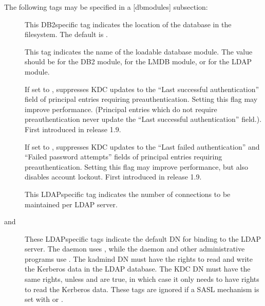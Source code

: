 \documentclass[letterpaper,10pt,english]{sphinxmanual}
\begin{document}
\sphinxAtStartPar
The following tags may be specified in a {[}dbmodules{]} subsection:
\begin{description}
\item[{}] \leavevmode
\sphinxAtStartPar
This DB2\sphinxhyphen{}specific tag indicates the location of the database in
the filesystem.  The default is {\hyperref[\detokenize{mitK5defaults:paths}]{}}.

\item[{}] \leavevmode
\sphinxAtStartPar
This tag indicates the name of the loadable database module.  The
value should be  for the DB2 module,  for the LMDB
module, or  for the LDAP module.

\item[{}] \leavevmode
\sphinxAtStartPar
If set to , suppresses KDC updates to the “Last successful
authentication” field of principal entries requiring
preauthentication.  Setting this flag may improve performance.
(Principal entries which do not require preauthentication never
update the “Last successful authentication” field.).  First
introduced in release 1.9.

\item[{}] \leavevmode
\sphinxAtStartPar
If set to , suppresses KDC updates to the “Last failed
authentication” and “Failed password attempts” fields of principal
entries requiring preauthentication.  Setting this flag may
improve performance, but also disables account lockout.  First
introduced in release 1.9.

\item[{}] \leavevmode
\sphinxAtStartPar
This LDAP\sphinxhyphen{}specific tag indicates the number of connections to be
maintained per LDAP server.

\item[{ and }] \leavevmode
\sphinxAtStartPar
These LDAP\sphinxhyphen{}specific tags indicate the default DN for binding to
the LDAP server.  The {\hyperref[\detokenize{admin/admin_commands/krb5kdc:krb5kdc-8}]{}} daemon uses
, while the {\hyperref[\detokenize{admin/admin_commands/kadmind:kadmind-8}]{}} daemon and other
administrative programs use .  The kadmind DN
must have the rights to read and write the Kerberos data in the
LDAP database.  The KDC DN must have the same rights, unless
 and  are true, in
which case it only needs to have rights to read the Kerberos data.
These tags are ignored if a SASL mechanism is set with
 or .


\end{description}
\end{document}
